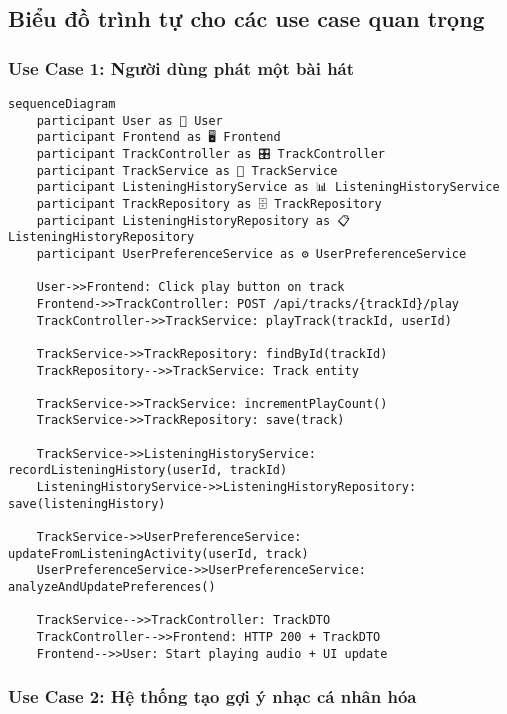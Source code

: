 \subsection{Biểu đồ trình tự cho các use case quan trọng}

\subsubsection{Use Case 1: Người dùng phát một bài hát}

\begin{verbatim}
sequenceDiagram
    participant User as 👤 User
    participant Frontend as 🖥️ Frontend
    participant TrackController as 🎛️ TrackController
    participant TrackService as 🔧 TrackService
    participant ListeningHistoryService as 📊 ListeningHistoryService
    participant TrackRepository as 🗄️ TrackRepository
    participant ListeningHistoryRepository as 📋 ListeningHistoryRepository
    participant UserPreferenceService as ⚙️ UserPreferenceService

    User->>Frontend: Click play button on track
    Frontend->>TrackController: POST /api/tracks/{trackId}/play
    TrackController->>TrackService: playTrack(trackId, userId)
    
    TrackService->>TrackRepository: findById(trackId)
    TrackRepository-->>TrackService: Track entity
    
    TrackService->>TrackService: incrementPlayCount()
    TrackService->>TrackRepository: save(track)
    
    TrackService->>ListeningHistoryService: recordListeningHistory(userId, trackId)
    ListeningHistoryService->>ListeningHistoryRepository: save(listeningHistory)
    
    TrackService->>UserPreferenceService: updateFromListeningActivity(userId, track)
    UserPreferenceService->>UserPreferenceService: analyzeAndUpdatePreferences()
    
    TrackService-->>TrackController: TrackDTO
    TrackController-->>Frontend: HTTP 200 + TrackDTO
    Frontend-->>User: Start playing audio + UI update
\end{verbatim}

\subsubsection{Use Case 2: Hệ thống tạo gợi ý nhạc cá nhân hóa}

